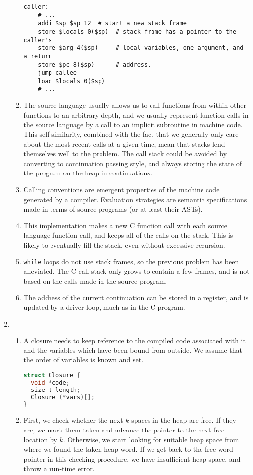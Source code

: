\documentclass{article}
\begin{document}
\begin{enumerate}
\begin{enumerate}
\begin{lstlisting}[language={[x86masm]Assembler},showstringspaces=false]
caller:
    # ...
    addi $sp $sp 12  # start a new stack frame
    store $locals 0($sp)  # stack frame has a pointer to the caller's
    store $arg 4($sp)     # local variables, one argument, and a return
    store $pc 8($sp)      # address.
    jump callee
    load $locals 0($sp)
    # ...\end{lstlisting}
      \item The source language usually allows us to call functions from within other functions to an arbitrary depth, and we usually represent function calls in the source language by a call to an implicit subroutine in machine code. This self-similarity, combined with the fact that we generally only care about the most recent calls at a given time, mean that stacks lend themselves well to the problem. The call stack could be avoided by converting to continuation passing style, and always storing the state of the program on the heap in continuations.
      \item Calling conventions are emergent properties of the machine code generated by a compiler. Evaluation strategies are semantic specifications made in terms of source programs (or at least their ASTs).
      \item This implementation makes a new C function call with each source language function call, and keeps all of the calls on the stack. This is likely to eventually fill the stack, even without excessive recursion.
      \item \texttt{while} loops do not use stack frames, so the previous problem has been alleviated. The C call stack only grows to contain a few frames, and is not based on the calls made in the source program.
      \item The address of the current continuation can be stored in a register, and is updated by a driver loop, much as in the C program.
    \end{enumerate}
  \item
    \begin{enumerate}
      \item A closure needs to keep reference to the compiled code associated with it and the variables which have been bound from outside. We assume that the order of variables is known and set.
        \begin{lstlisting}[language=C]
struct Closure {
  void *code;
  size_t length;
  Closure (*vars)[];
}
        \end{lstlisting}
      \item First, we check whether the next $k$ spaces in the heap are free. If they are, we mark them taken and advance the pointer to the next free location by $k$. Otherwise, we start looking for suitable heap space from where we found the taken heap word. If we get back to the free word pointer in this checking procedure, we have insufficient heap space, and throw a run-time error.

\end{enumerate}
\end{enumerate}
\end{document}
